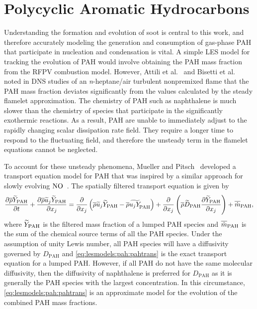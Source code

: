 \section{Polycyclic Aromatic Hydrocarbons}
\label{sec:lesmodels:pah}

Understanding the formation and evolution of soot is central to this work, and therefore accurately modeling the generation and consumption of gas-phase PAH that participate in nucleation and condensation is vital. A simple LES model for tracking the evolution of PAH would involve obtaining the PAH mass fraction from the RFPV combustion model. However, Attili et al.~\cite{attili2014} and Bisetti et al.~\cite{bisetti2012} noted in DNS studies of an \textit{n}-heptane/air turbulent nonpremixed flame that the PAH mass fraction deviates significantly from the values calculated by the steady flamelet approximation. The chemistry of PAH such as naphthalene is much slower than the chemistry of species that participate in the significantly exothermic reactions. As a result, PAH are unable to immediately adjust to the rapidly changing scalar dissipation rate field. They require a longer time to respond to the fluctuating field, and therefore the unsteady term in the flamelet equations cannot be neglected.

To account for these unsteady phenomena, Mueller and Pitsch~\cite{mueller2012} developed a transport equation model for PAH that was inspired by a similar approach for slowly evolving $\ce{NO}$~\cite{ihme2008}. The spatially filtered transport equation is given by
\begin{equation}\label{eq:lesmodels:pah:pahtrans}
  \ftrder{\tf{Y}_{\text{PAH}}} = \dsff[\tf{Y}_{\text{PAH}}]{\tf{u_j Y}_{\hspace{-3pt}\text{PAH}}} + \fdt[\text{PAH}]{\tf{Y}_{\text{PAH}}} + \fst[m]{\text{PAH}},
\end{equation}
where $\tf{Y}_{\text{PAH}}$ is the filtered mass fraction of a lumped PAH species and $\fst[m]{\text{PAH}}$ is the sum of the chemical source terms of all the PAH species. Under the assumption of unity Lewis number, all PAH species will have a diffusivity governed by $D_{\text{PAH}}$ and \cref{eq:lesmodels:pah:pahtrans} is the exact transport equation for a lumped PAH. However, if all PAH do not have the same molecular diffusivity, then the diffusivity of naphthalene is preferred for $D_{\text{PAH}}$ as it is generally the PAH species with the largest concentration. In this circumstance, \cref{eq:lesmodels:pah:pahtrans} is an approximate model for the evolution of the combined PAH mass fractions.

